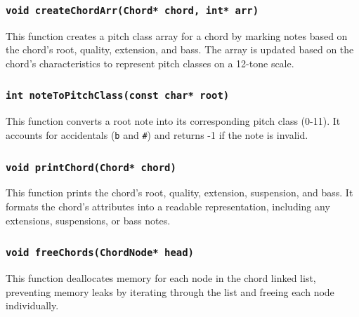\documentclass{article}
\begin{document}
\subsubsection{\texttt{void createChordArr(Chord* chord, int* arr)}} This function creates a pitch class array for a chord by marking notes based on the chord's root, quality, extension, and bass. The array is updated based on the chord's characteristics to represent pitch classes on a 12-tone scale.

\subsubsection{\texttt{int noteToPitchClass(const char* root)}} This function converts a root note into its corresponding pitch class (0-11). It accounts for accidentals (\texttt{b} and \texttt{\#}) and returns -1 if the note is invalid.

\subsubsection{\texttt{void printChord(Chord* chord)}} This function prints the chord's root, quality, extension, suspension, and bass. It formats the chord's attributes into a readable representation, including any extensions, suspensions, or bass notes.

\subsubsection{\texttt{void freeChords(ChordNode* head)}} This function deallocates memory for each node in the chord linked list, preventing memory leaks by iterating through the list and freeing each node individually.
\end{document}
